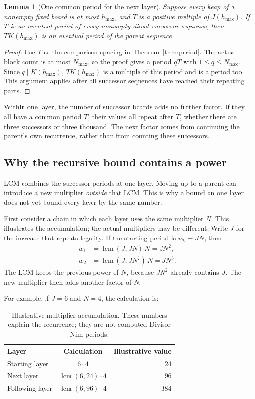 \documentclass[10pt,a4paper]{article}
\newtheorem{lemma}[theorem]{Lemma}
\begin{document}
\begin{lemma}[One common period for the next layer]
\label{lem:commonlayer}
Suppose every heap of a nonempty fixed board is at most
$h_{\max}$, and $T$ is a positive multiple of $J(h_{\max})$.
If $T$ is an eventual period of every nonempty direct-successor
sequence, then $T K(h_{\max})$ is an eventual period of the
parent sequence.
\end{lemma}
\begin{proof}
Use $T$ as the comparison spacing in
Theorem~\ref{thm:period}. The actual block count is at most
$N_{\max}$, so the proof gives a period $qT$ with
$1\le q\le N_{\max}$. Since $q\mid K(h_{\max})$,
$T K(h_{\max})$ is a multiple of this period and is a period
too. This argument applies after all successor sequences have
reached their repeating parts.
\end{proof}

Within one layer, the number of successor boards adds no further
factor. If they all have a common period $T$, their values all
repeat after $T$, whether there are three successors or three
thousand. The next factor comes from continuing the parent's
own recurrence, rather than from counting these successors.

\subsection{Why the recursive bound contains a power}

LCM combines the successor periods at one layer. Moving up to a
parent can introduce a new multiplier \emph{outside} that LCM.
This is why a bound on one layer does not yet bound every layer
by the same number.

First consider a chain in which each layer uses the same multiplier
$N$. This illustrates the accumulation; the actual multipliers
may be different. Write $J$ for the increase that repeats legality.
If the starting period is $w_0=JN$, then
\[
 \begin{aligned}
 w_1&=\operatorname{lcm}(J,JN)\,N=JN^2,\\
 w_2&=\operatorname{lcm}(J,JN^2)\,N=JN^3.
 \end{aligned}
\]
The LCM keeps the previous power of $N$, because $JN^2$ already
contains $J$. The new multiplier then adds another factor of $N$.

For example, if $J=6$ and $N=4$, the calculation is:

\begin{table}[H]
\centering
\begin{tabular}{@{}l c r@{}}
\toprule
Layer & Calculation & Illustrative value \\
\midrule
Starting layer & $6\cdot4$ & $24$ \\
\addlinespace[6pt]
Next layer & $\operatorname{lcm}(6,24)\cdot4$ & $96$ \\
\addlinespace[6pt]
Following layer & $\operatorname{lcm}(6,96)\cdot4$ & $384$ \\
\bottomrule
\end{tabular}
\caption{Illustrative multiplier accumulation. These numbers
explain the recurrence; they are not computed Divisor Nim periods.}
\label{tab:layerillustration}
\end{table}
\end{document}
